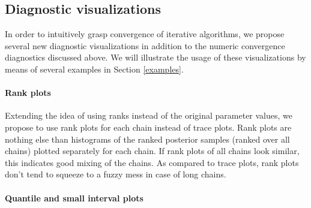 \documentclass[american,]{article}
\providecommand{\tightlist}{%
  \setlength{\itemsep}{0pt}\setlength{\parskip}{0pt}}
\let\oldparagraph\paragraph
\renewcommand{\paragraph}[1]{\oldparagraph{#1}\mbox{}}
\begin{document}



\hypertarget{diagnostic-visualizations}{%
\subsection{Diagnostic visualizations}\label{diagnostic-visualizations}}

In order to intuitively grasp convergence of iterative algorithms, we
propose several new diagnostic visualizations in addition to the numeric
convergence diagnostics discussed above. We will illustrate the usage of
these visualizations by means of several examples in Section
\ref{examples}.

\hypertarget{rank-plots}{%
\paragraph{Rank plots}\label{rank-plots}}

Extending the idea of using ranks instead of the original parameter
values, we propose to use rank plots for each chain instead
of trace plots. Rank plots are nothing else than histograms of the
ranked posterior samples (ranked over all chains) plotted separately for
each chain. If rank plots of all chains look similar, this indicates
good mixing of the chains. As compared to trace plots, rank plots don't
tend to squeeze to a fuzzy mess in case of long chains.

\hypertarget{quantile-and-small-interval-plots}{%
\paragraph{Quantile and small interval
plots}\label{quantile-and-small-interval-plots}}
\end{document}
